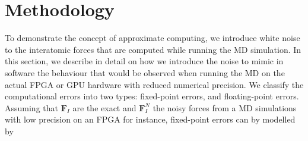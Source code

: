 \documentclass[format=acmsmall,urlbreakonhyphens]{acmart}
\begin{document}
\section{Methodology}
\label{sec:methodology}
To demonstrate the concept of approximate computing, we introduce white noise to the interatomic forces that are computed while running the MD simulation. In this section, we describe in detail on how we introduce the noise to mimic in software the behaviour that would be observed when running the MD on the actual FPGA or GPU hardware with reduced numerical precision. We classify the computational errors into two types: fixed-point errors, and floating-point errors. Assuming that $\textbf{F}_{I}$ are the exact and $\textbf{F}_{I}^{N}$ the noisy forces from a MD simulations with low precision on an FPGA for instance, fixed-point errors can by modelled by
\end{document}

